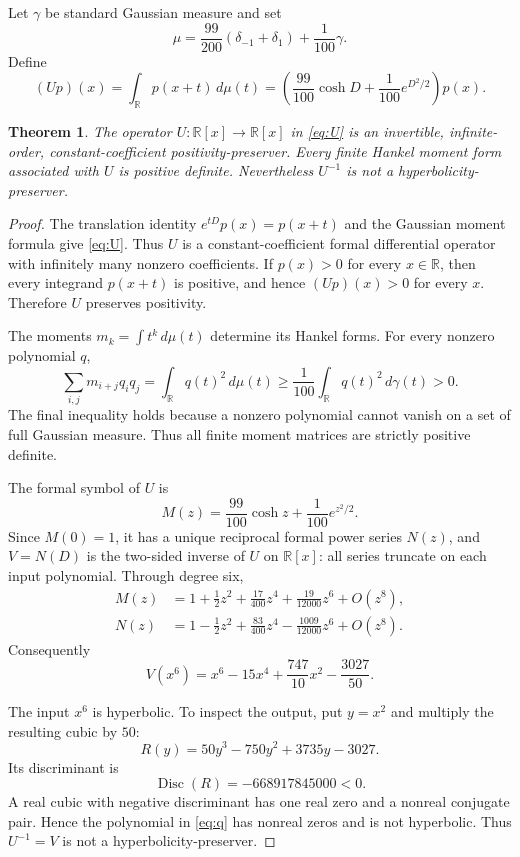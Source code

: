 \documentclass[11pt,a4paper]{article}
\newtheorem{theorem}{Theorem}
\newcommand{\R}{\mathbb R}
\begin{document}
Let $\gamma$ be standard Gaussian measure and set
\begin{equation}\label{eq:mu}
 \mu=\frac{99}{200}(\delta_{-1}+\delta_1)+\frac1{100}\gamma.
\end{equation}
Define
\begin{equation}\label{eq:U}
 (Up)(x)=\int_\R p(x+t)\,d\mu(t)
 =\left(\frac{99}{100}\cosh D+\frac{1}{100}e^{D^2/2}\right)p(x).
\end{equation}

\begin{theorem}\label{thm:main}
The operator $U:\R[x]\to\R[x]$ in \eqref{eq:U} is an invertible,
infinite-order, constant-coefficient positivity-preserver.  Every finite
Hankel moment form associated with $U$ is positive definite.  Nevertheless
$U^{-1}$ is not a hyperbolicity-preserver.
\end{theorem}

\begin{proof}
The translation identity $e^{tD}p(x)=p(x+t)$ and the Gaussian moment formula
give \eqref{eq:U}.  Thus $U$ is a constant-coefficient formal differential
operator with infinitely many nonzero coefficients.  If $p(x)>0$ for every
$x\in\R$, then every integrand $p(x+t)$ is positive, and hence
$(Up)(x)>0$ for every $x$.  Therefore $U$ preserves positivity.

The moments $m_k=\int t^k\,d\mu(t)$ determine its Hankel forms.  For every
nonzero polynomial $q$,
\[
 \sum_{i,j}m_{i+j}q_iq_j
 =\int_\R q(t)^2\,d\mu(t)
 \ge \frac1{100}\int_\R q(t)^2\,d\gamma(t)>0.
\]
The final inequality holds because a nonzero polynomial cannot vanish on a
set of full Gaussian measure.  Thus all finite moment matrices are strictly
positive definite.

The formal symbol of $U$ is
\[
 M(z)=\frac{99}{100}\cosh z+\frac1{100}e^{z^2/2}.
\]
Since $M(0)=1$, it has a unique reciprocal formal power series $N(z)$, and
$V=N(D)$ is the two-sided inverse of $U$ on $\R[x]$: all series truncate on
each input polynomial.  Through degree six,
\begin{align*}
 M(z)&=1+\frac12z^2+\frac{17}{400}z^4
          +\frac{19}{12000}z^6+O(z^8),\\
 N(z)&=1-\frac12z^2+\frac{83}{400}z^4
          -\frac{1009}{12000}z^6+O(z^8).
\end{align*}
Consequently
\begin{equation}\label{eq:q}
 V(x^6)=x^6-15x^4+\frac{747}{10}x^2-\frac{3027}{50}.
\end{equation}

The input $x^6$ is hyperbolic.  To inspect the output, put $y=x^2$ and
multiply the resulting cubic by $50$:
\[
 R(y)=50y^3-750y^2+3735y-3027.
\]
Its discriminant is
\begin{equation}\label{eq:disc}
 \operatorname{Disc}(R)=-668917845000<0.
\end{equation}
A real cubic with negative discriminant has one real zero and a nonreal
conjugate pair.  Hence the polynomial in \eqref{eq:q} has nonreal zeros and
is not hyperbolic.  Thus $U^{-1}=V$ is not a
hyperbolicity-preserver.
\end{proof}
\end{document}
